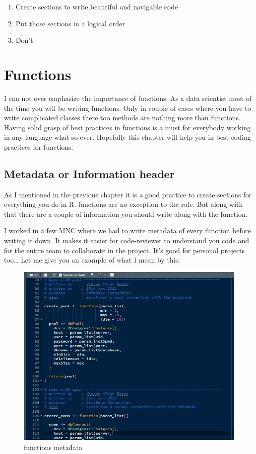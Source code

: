 \documentclass[
]{book}
\providecommand{\tightlist}{%
  \setlength{\itemsep}{0pt}\setlength{\parskip}{0pt}}
\begin{document}
\begin{enumerate}
\def\labelenumi{\arabic{enumi}.}
\tightlist
\item
  Create sections to write beautiful and navigable code
\item
  Put those sections in a logical order
\item
  Don't
\end{enumerate}

\hypertarget{func}{%
\chapter{Functions}\label{func}}

I can not over emphasize the importance of functions. As a data scientist most of the time you will be writing functions. Only in couple of cases where you have to write complicated classes there too methods are nothing more than functions. Having solid grasp of best practices in functions is a must for everybody working in any language what-so-ever. Hopefully this chapter will help you in best coding practices for functions.

\hypertarget{metadata-or-information-header}{%
\section{Metadata or Information header}\label{metadata-or-information-header}}

As I mentioned in the previous chapter it is a good practice to create sections for everything you do in R. functions are no exception to the rule. But along with that there are a couple of information you should write along with the function.

I worked in a few MNC where we had to write metadata of every function before writing it down. It makes it easier for code-reviewer to understand you code and for the entire team to collaborate in the project. It's good for personal projects too\ldots{} Let me give you an example of what I mean by this.

\begin{figure}
\centering
\includegraphics{./figures/scrn_functions_metadata.jpg}
\caption{functions metadata}
\end{figure}
\end{document}
